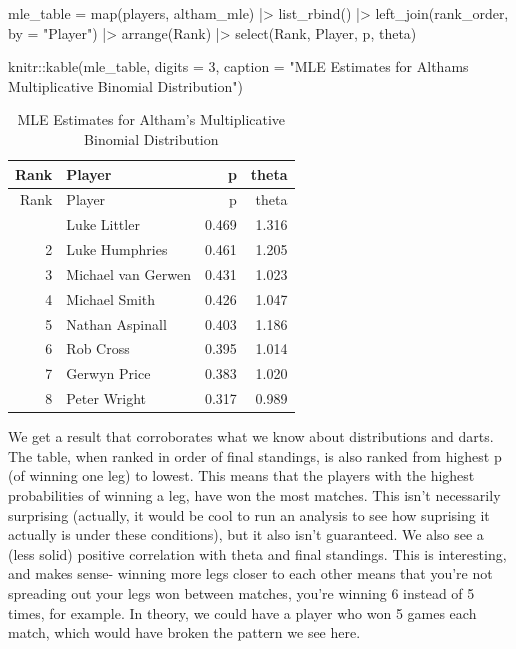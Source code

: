 \documentclass[
]{article}
\newenvironment{Shaded}{\begin{snugshade}}{\end{snugshade}}
\newcommand{\AttributeTok}[1]{\textcolor[rgb]{0.40,0.45,0.13}{#1}}
\newcommand{\DecValTok}[1]{\textcolor[rgb]{0.68,0.00,0.00}{#1}}
\newcommand{\FunctionTok}[1]{\textcolor[rgb]{0.28,0.35,0.67}{#1}}
\newcommand{\NormalTok}[1]{\textcolor[rgb]{0.00,0.23,0.31}{#1}}
\newcommand{\OtherTok}[1]{\textcolor[rgb]{0.00,0.23,0.31}{#1}}
\newcommand{\SpecialCharTok}[1]{\textcolor[rgb]{0.37,0.37,0.37}{#1}}
\newcommand{\StringTok}[1]{\textcolor[rgb]{0.13,0.47,0.30}{#1}}
\begin{document}
\begin{Shaded}
\begin{Highlighting}[numbers=left,,]
\NormalTok{mle\_table }\OtherTok{=} \FunctionTok{map}\NormalTok{(players, altham\_mle) }\SpecialCharTok{|\textgreater{}} \FunctionTok{list\_rbind}\NormalTok{() }\SpecialCharTok{|\textgreater{}}
  \FunctionTok{left\_join}\NormalTok{(rank\_order, }\AttributeTok{by =} \StringTok{"Player"}\NormalTok{) }\SpecialCharTok{|\textgreater{}}
  \FunctionTok{arrange}\NormalTok{(Rank) }\SpecialCharTok{|\textgreater{}}
  \FunctionTok{select}\NormalTok{(Rank, Player, p, theta)}

\NormalTok{knitr}\SpecialCharTok{::}\FunctionTok{kable}\NormalTok{(mle\_table, }\AttributeTok{digits =} \DecValTok{3}\NormalTok{,}
             \AttributeTok{caption =} \StringTok{"MLE Estimates for Altham\textquotesingle{}s Multiplicative Binomial Distribution"}\NormalTok{)}
\end{Highlighting}
\end{Shaded}

\begin{longtable}[]{@{}rlrr@{}}
\caption{MLE Estimates for Altham's Multiplicative Binomial
Distribution}\tabularnewline
\toprule\noalign{}
Rank & Player & p & theta \\
\midrule\noalign{}
\endfirsthead
\toprule\noalign{}
Rank & Player & p & theta \\
\midrule\noalign{}
\endhead
\bottomrule\noalign{}
\endlastfoot
1 & Luke Littler & 0.469 & 1.316 \\
2 & Luke Humphries & 0.461 & 1.205 \\
3 & Michael van Gerwen & 0.431 & 1.023 \\
4 & Michael Smith & 0.426 & 1.047 \\
5 & Nathan Aspinall & 0.403 & 1.186 \\
6 & Rob Cross & 0.395 & 1.014 \\
7 & Gerwyn Price & 0.383 & 1.020 \\
8 & Peter Wright & 0.317 & 0.989 \\
\end{longtable}

\normalsize

We get a result that corroborates what we know about distributions and
darts. The table, when ranked in order of final standings, is also
ranked from highest p (of winning one leg) to lowest. This means that
the players with the highest probabilities of winning a leg, have won
the most matches. This isn't necessarily surprising (actually, it would
be cool to run an analysis to see how suprising it actually is under
these conditions), but it also isn't guaranteed. We also see a (less
solid) positive correlation with theta and final standings. This is
interesting, and makes sense- winning more legs closer to each other
means that you're not spreading out your legs won between matches,
you're winning 6 instead of 5 times, for example. In theory, we could
have a player who won 5 games each match, which would have broken the
pattern we see here.
\end{document}
